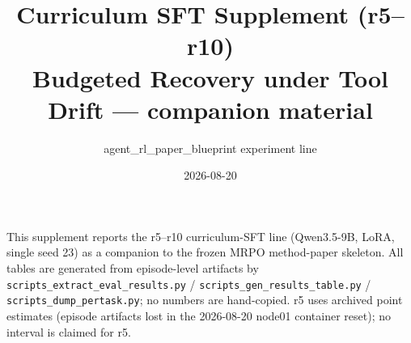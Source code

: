 \documentclass[11pt]{article}
\title{Curriculum SFT Supplement (r5--r10)\\
\large Budgeted Recovery under Tool Drift --- companion material}
\author{agent\_rl\_paper\_blueprint experiment line}
\date{2026-08-20}
\begin{document}
\maketitle

This supplement reports the r5--r10 curriculum-SFT line (Qwen3.5-9B, LoRA, single
seed 23) as a companion to the frozen MRPO method-paper skeleton. All tables are
generated from episode-level artifacts by
\texttt{scripts\_extract\_eval\_results.py} / \texttt{scripts\_gen\_results\_table.py}
/ \texttt{scripts\_dump\_pertask.py}; no numbers are hand-copied. r5 uses archived
point estimates (episode artifacts lost in the 2026-08-20 node01 container
reset); no interval is claimed for r5.






\end{document}
